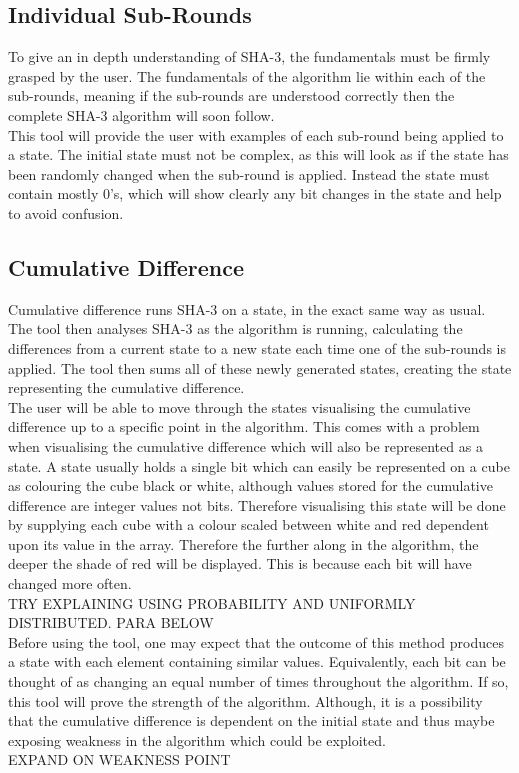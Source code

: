 \subsection{Individual Sub-Rounds}
To give an in depth understanding of SHA-3, the fundamentals must be firmly grasped by the user. The fundamentals of the algorithm lie within each of the sub-rounds, meaning if the sub-rounds are understood correctly then the complete SHA-3 algorithm will soon follow.
\vspace{5 mm}\\
This tool will provide the user with examples of each sub-round being applied to a state. The initial state must not be complex, as this will look as if the state has been randomly changed when the sub-round is applied. Instead the state must contain mostly 0's, which will show clearly any bit changes in the state and help to avoid confusion.
\subsection{Cumulative Difference}
Cumulative difference runs SHA-3 on a state, in the exact same way as usual. The tool then analyses SHA-3 as the algorithm is running, calculating the differences from a current state to a new state each time one of the sub-rounds is applied. The tool then sums all of these newly generated states, creating the state representing the cumulative difference.
\vspace{5 mm}\\
The user will be able to move through the states visualising the cumulative difference up to a specific point in the algorithm. This comes with a problem when visualising the cumulative difference which will also be represented as a state. A state usually holds a single bit which can easily be represented on a cube as colouring the cube black or white, although values stored for the cumulative difference are integer values not bits. Therefore visualising this state will be done by supplying each cube with a colour scaled between white and red dependent upon its value in the array. Therefore the further along in the algorithm, the deeper the shade of red will be displayed. This is because each bit will have changed more often. 
\vspace{5 mm}\\
TRY EXPLAINING USING PROBABILITY AND UNIFORMLY DISTRIBUTED. PARA BELOW
\vspace{5 mm}\\
Before using the tool, one may expect that the outcome of this method produces a state with each element containing similar values. Equivalently, each bit can be thought of as changing an equal number of times throughout the algorithm. If so, this tool will prove the strength of the algorithm. Although, it is a possibility that the cumulative difference is dependent on the initial state and thus maybe exposing weakness in the algorithm which could be exploited.
\vspace{5 mm}\\
EXPAND ON WEAKNESS POINT
\vspace{5 mm}\\
